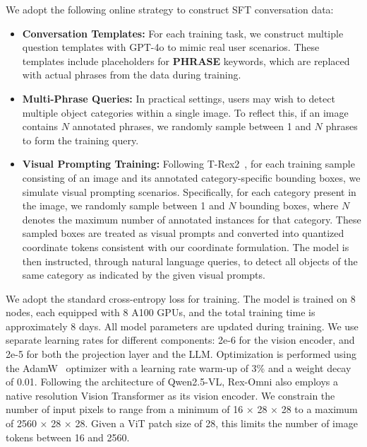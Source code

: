 We adopt the following online strategy to construct SFT conversation data:
\vspace{-1em}
\begin{itemize}
    \item \textbf{Conversation Templates:} For each training task, we construct multiple question templates with GPT-4o to mimic real user scenarios. These templates include placeholders for \textbf{PHRASE} keywords, which are replaced with actual phrases from the data during training.
    \item \textbf{Multi-Phrase Queries:} In practical settings, users may wish to detect multiple object categories within a single image. To reflect this, if an image contains $N$ annotated phrases, we randomly sample between 1 and $N$ phrases to form the training query.
    \item \textbf{Visual Prompting Training:} Following T-Rex2~\cite{jiang2025t}, for each training sample consisting of an image and its annotated category-specific bounding boxes, we simulate visual prompting scenarios. Specifically, for each category present in the image, we randomly sample between 1 and $N$ bounding boxes, where $N$ denotes the maximum number of annotated instances for that category. These sampled boxes are treated as visual prompts and converted into quantized coordinate tokens consistent with our coordinate formulation. The model is then instructed, through natural language queries, to detect all objects of the same category as indicated by the given visual prompts.

\end{itemize}

\noindent We adopt the standard cross-entropy loss for training. The model is trained on 8 nodes, each equipped with 8 A100 GPUs, and the total training time is approximately 8 days. All model parameters are updated during training. We use separate learning rates for different components: 2e-6 for the vision encoder, and 2e-5 for both the projection layer and the LLM. Optimization is performed using the AdamW~\cite{loshchilov2017adamw} optimizer with a learning rate warm-up of 3\% and a weight decay of 0.01. Following the architecture of Qwen2.5-VL, Rex-Omni also employs a native resolution Vision Transformer as its vision encoder. We constrain the number of input pixels to range from a minimum of 16 × 28 × 28 to a maximum of 2560 × 28 × 28. Given a ViT patch size of 28, this limits the number of image tokens between 16 and 2560.


